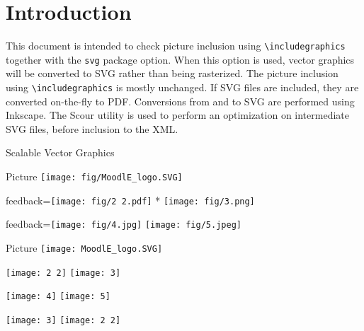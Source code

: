 \documentclass{article}
\begin{document}
\section*{Introduction}

This document is intended to check picture inclusion using 
\verb|\includegraphics| together with the \texttt{svg} package option.
When this option is used, vector graphics will be converted to SVG rather than 
being rasterized. The picture inclusion using \verb|\includegraphics| is mostly 
unchanged. If SVG files are included, they are converted on-the-fly to PDF.
Conversions from and to SVG are performed using \textsf{Inkscape}. The 
\textsf{Scour} utility is used to perform an optimization on intermediate SVG 
files, before inclusion to the XML.

\begin{quiz}{Scalable Vector Graphics}

\begin{multi}{Picture}
\texttt{[image: fig/MoodlE\_logo.SVG]}
\item[feedback={\texttt{[image: fig/2 2.pdf]}}]* \texttt{[image: fig/3.png]}
\item[feedback={\texttt{[image: fig/4.jpg]}}] \texttt{[image: fig/5.jpeg]}
\end{multi}

\graphicspath{{./fig/}}

\begin{matching}[dd]{Picture}
\texttt{[image: MoodlE\_logo.SVG]}
\item \texttt{[image: 2 2]} \answer \texttt{[image: 3]}
\item \texttt{[image: 4]} \answer \texttt{[image: 5]}
\item \texttt{[image: 3]} \answer \texttt{[image: 2 2]}
\end{matching}

\end{quiz}
\end{document}

